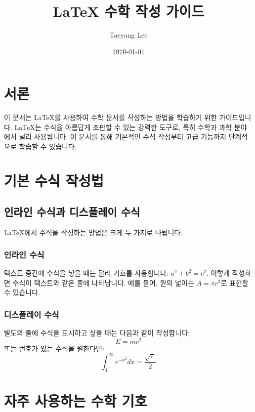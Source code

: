 \documentclass[12pt,a4paper]{article}
\title{LaTeX 수학 작성 가이드}
\author{Taeyang Lee}
\date{\today}
\begin{document}
\maketitle
\tableofcontents  %
\newpage

\section{서론}

이 문서는 LaTeX를 사용하여 수학 문서를 작성하는 방법을 학습하기 위한 가이드입니다.
LaTeX는 수식을 아름답게 조판할 수 있는 강력한 도구로, 특히 수학과 과학 분야에서 널리 사용됩니다.
이 문서를 통해 기본적인 수식 작성부터 고급 기능까지 단계적으로 학습할 수 있습니다.

\section{기본 수식 작성법}

\subsection{인라인 수식과 디스플레이 수식}

LaTeX에서 수식을 작성하는 방법은 크게 두 가지로 나뉩니다.

\subsubsection{인라인 수식}
텍스트 중간에 수식을 넣을 때는 달러 기호를 사용합니다: $a^2 + b^2 = c^2$.
이렇게 작성하면 수식이 텍스트와 같은 줄에 나타납니다.
예를 들어, 원의 넓이는 $A = \pi r^2$로 표현할 수 있습니다.

\subsubsection{디스플레이 수식}
별도의 줄에 수식을 표시하고 싶을 때는 다음과 같이 작성합니다:
\[
    E = mc^2
\]
또는 번호가 있는 수식을 원한다면:
\begin{equation}
    \int_{0}^{\infty} e^{-x^2} dx = \frac{\sqrt{\pi}}{2}
\end{equation}


\section{자주 사용하는 수학 기호}
\end{document}

